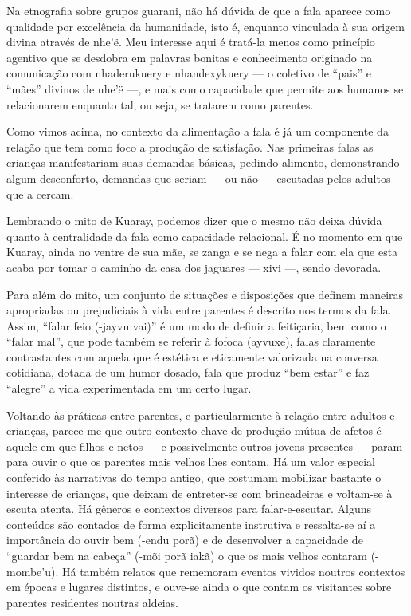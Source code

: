 Na etnografia sobre grupos guarani, não há dúvida de que a fala aparece
como qualidade por excelência da humanidade, isto é, enquanto vinculada
à sua origem divina através de nhe’ë. Meu interesse aqui é tratá-la
menos como princípio agentivo que se desdobra em palavras bonitas e
conhecimento originado na comunicação com nhaderukuery e nhandexykuery
--- o coletivo de ``pais'' e ``mães'' divinos de nhe’ë ---, e mais como
capacidade que permite aos humanos se relacionarem enquanto tal, ou
seja, se tratarem como parentes.

Como vimos acima, no contexto da alimentação a fala é já um componente
da relação que tem como foco a produção de satisfação. Nas primeiras
falas as crianças manifestariam suas demandas básicas, pedindo
alimento, demonstrando algum desconforto, demandas que seriam --- ou não
--- escutadas pelos adultos que a cercam. 

Lembrando o mito de Kuaray, podemos dizer que o mesmo não deixa dúvida
quanto à centralidade da fala como capacidade relacional. É no momento
em que Kuaray, ainda no ventre de sua mãe, se zanga e se nega a falar
com ela que esta acaba por tomar o caminho da casa dos jaguares --- xivi
---, sendo devorada.

Para além do mito, um conjunto de situações e disposições que definem
maneiras apropriadas ou prejudiciais à vida entre parentes é descrito
nos termos da fala. Assim, ``falar feio (-jayvu vai)'' é um modo de
definir a feitiçaria, bem como o ``falar mal'', que pode também se
referir à fofoca (ayvuxe), falas claramente contrastantes com aquela
que é estética e eticamente valorizada na conversa cotidiana, dotada de
um humor dosado, fala que produz ``bem estar'' e faz ``alegre'' a vida
experimentada em um certo lugar.

Voltando às práticas entre parentes, e particularmente à relação entre
adultos e crianças, parece-me que outro contexto chave de produção
mútua de afetos é aquele em que filhos e netos --- e possivelmente outros
jovens presentes --- param para ouvir o que os parentes mais velhos lhes
contam. Há um valor especial conferido às narrativas do tempo antigo,
que costumam mobilizar bastante o interesse de crianças, que deixam de
entreter-se com brincadeiras e voltam-se à escuta atenta. Há gêneros e
contextos diversos para falar-e-escutar. Alguns conteúdos são contados
de forma explicitamente instrutiva e ressalta-se aí a importância do
ouvir bem (-endu porã) e de desenvolver a capacidade de ``guardar bem na
cabeça'' (-mõi porã iakã) o que os mais velhos contaram (-mombe’u). Há
também relatos que rememoram eventos vividos noutros contextos em
épocas e lugares distintos, e ouve-se ainda o que contam os visitantes
sobre parentes residentes noutras aldeias.

